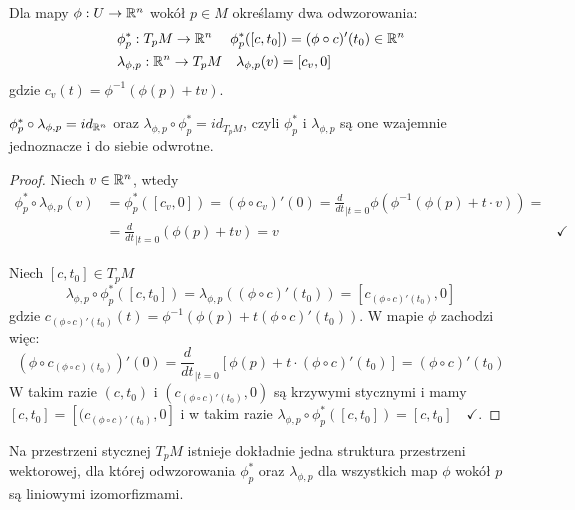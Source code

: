 Dla mapy $\phi:U\to \mathbb{R}^n$ wokół $p\in M$ określamy dwa odwzorowania:
\begin{align*}
  &\phi_p^*:T_pM\to\mathbb{R}^n\quad\; \phi_p^*([c, t_0])=(\phi\circ c)'(t_0)\in \mathbb{R}^n\\
  &\lambda_{\phi,p}:\mathbb{R}^n\to T_pM\quad \lambda_{\phi,p}(v)=[c_v, 0]
\end{align*}
gdzie $c_v(t)=\phi^{-1}(\phi(p)+tv)$. 

\begin{lemma}
  $\phi^*_p\circ\lambda_{\phi, p}=id_{\mathbb{R}^n}$ oraz $\lambda_{\phi, p}\circ\phi_p^*=id_{T_pM}$, czyli $\phi_p^*$ i $\lambda_{\phi,p}$ są one wzajemnie jednoznacze i do siebie odwrotne.
\end{lemma}

\begin{proof}
  Niech $v\in\mathbb{R}^n$, wtedy
  \begin{align*}
    \phi_p^*\circ\lambda_{\phi, p}(v)&=\phi^*_p([c_v, 0])=(\phi\circ c_v)'(0)=\frac{d}{dt}_{{\scriptstyle|t=0}}\phi(\phi^{-1}(\phi(p)+t\cdot v))=\\
                                     &=\frac{d}{dt}_{{\scriptstyle|t=0}}(\phi(p)+tv)=v &\checkmark
  \end{align*}

  Niech $[c, t_0]\in T_pM$
  $$\lambda_{\phi, p}\circ\phi_p^*([c, t_0])=\lambda_{\phi, p}((\phi\circ c)'(t_0))=[c_{(\phi\circ c)'(t_0)}, 0]$$
  gdzie $c_{(\phi\circ c)'(t_0)}(t)=\phi^{-1}(\phi(p)+t(\phi\circ c)'(t_0))$. W mapie $\phi$ zachodzi więc:
  $$(\phi\circ c_{(\phi\circ c)(t_0)})'(0)=\frac{d}{dt}_{{\scriptstyle|t=0}}[\phi(p)+t\cdot(\phi\circ c)'(t_0)]=(\phi\circ c)'(t_0)$$
  W takim razie $(c, t_0)$ i $(c_{(\phi\circ c)'(t_0)}, 0)$ są krzywymi stycznymi i mamy $[c, t_0]=[(c_{(\phi\circ c)'(t_0)}, 0]$ i w takim razie $\lambda_{\phi, p}\circ\phi_p^*([c, t_0])=[c, t_0]\quad\checkmark$.
\end{proof}

\begin{fact}\label{przestrzen styczna jest wektorowa}
Na przestrzeni stycznej $T_pM$ istnieje dokładnie jedna struktura przestrzeni wektorowej, dla której odwzorowania $\phi_p^*$ oraz $\lambda_{\phi, p}$ dla wszystkich map $\phi$ wokół $p$ są liniowymi izomorfizmami. 
\end{fact}

